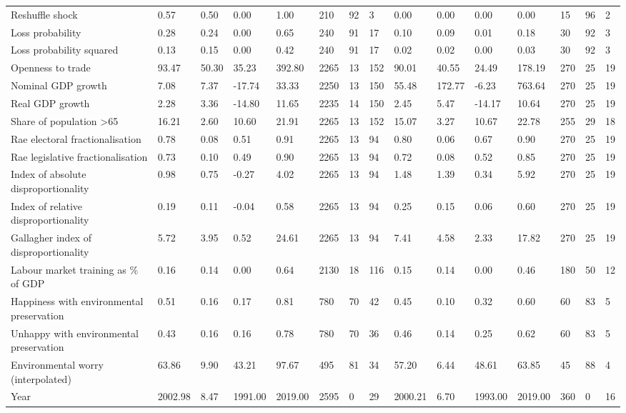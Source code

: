 \begin{longtable}{lllllllllllllll}
\addlinespace
Reshuffle shock & 0.57 & 0.50 & 0.00 & 1.00 & 210 & 92 & 3 & 0.00 & 0.00 & 0.00 & 0.00 & 15 & 96 & 2\\
Loss probability & 0.28 & 0.24 & 0.00 & 0.65 & 240 & 91 & 17 & 0.10 & 0.09 & 0.01 & 0.18 & 30 & 92 & 3\\
Loss probability squared & 0.13 & 0.15 & 0.00 & 0.42 & 240 & 91 & 17 & 0.02 & 0.02 & 0.00 & 0.03 & 30 & 92 & 3\\
Openness to trade & 93.47 & 50.30 & 35.23 & 392.80 & 2265 & 13 & 152 & 90.01 & 40.55 & 24.49 & 178.19 & 270 & 25 & 19\\
Nominal GDP growth & 7.08 & 7.37 & -17.74 & 33.33 & 2250 & 13 & 150 & 55.48 & 172.77 & -6.23 & 763.64 & 270 & 25 & 19\\
\addlinespace
Real GDP growth & 2.28 & 3.36 & -14.80 & 11.65 & 2235 & 14 & 150 & 2.45 & 5.47 & -14.17 & 10.64 & 270 & 25 & 19\\
Share of population >65 & 16.21 & 2.60 & 10.60 & 21.91 & 2265 & 13 & 152 & 15.07 & 3.27 & 10.67 & 22.78 & 255 & 29 & 18\\
Rae electoral fractionalisation & 0.78 & 0.08 & 0.51 & 0.91 & 2265 & 13 & 94 & 0.80 & 0.06 & 0.67 & 0.90 & 270 & 25 & 19\\
Rae legislative fractionalisation & 0.73 & 0.10 & 0.49 & 0.90 & 2265 & 13 & 94 & 0.72 & 0.08 & 0.52 & 0.85 & 270 & 25 & 19\\
Index of absolute disproportionality & 0.98 & 0.75 & -0.27 & 4.02 & 2265 & 13 & 94 & 1.48 & 1.39 & 0.34 & 5.92 & 270 & 25 & 19\\
\addlinespace
Index of relative disproportionality & 0.19 & 0.11 & -0.04 & 0.58 & 2265 & 13 & 94 & 0.25 & 0.15 & 0.06 & 0.60 & 270 & 25 & 19\\
Gallagher index of disproportionality & 5.72 & 3.95 & 0.52 & 24.61 & 2265 & 13 & 94 & 7.41 & 4.58 & 2.33 & 17.82 & 270 & 25 & 19\\
Labour market training as \% of GDP & 0.16 & 0.14 & 0.00 & 0.64 & 2130 & 18 & 116 & 0.15 & 0.14 & 0.00 & 0.46 & 180 & 50 & 12\\
Happiness with environmental preservation & 0.51 & 0.16 & 0.17 & 0.81 & 780 & 70 & 42 & 0.45 & 0.10 & 0.32 & 0.60 & 60 & 83 & 5\\
Unhappy with environmental preservation & 0.43 & 0.16 & 0.16 & 0.78 & 780 & 70 & 36 & 0.46 & 0.14 & 0.25 & 0.62 & 60 & 83 & 5\\
\addlinespace
Environmental worry (interpolated) & 63.86 & 9.90 & 43.21 & 97.67 & 495 & 81 & 34 & 57.20 & 6.44 & 48.61 & 63.85 & 45 & 88 & 4\\
Year & 2002.98 & 8.47 & 1991.00 & 2019.00 & 2595 & 0 & 29 & 2000.21 & 6.70 & 1993.00 & 2019.00 & 360 & 0 & 16\\
\bottomrule
\end{longtable}
